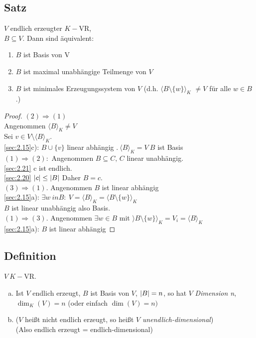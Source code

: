 \subsection{Satz}\label{sec:2.22}
$V$ endlich erzeugter $K-$VR,\\
$B \subseteq V.$ Dann sind äquivalent:\\
\begin{enumerate}[(1)]
\item $B$ ist Basis von V
\item $B$ ist maximal unabhängige Teilmenge von $V$
\item $B$ ist minimales Erzeugungssystem von $V$ (d.h. $\langle B \setminus \{w\}\rangle_K$ $\ne V$ für alle $w \in B$.)
\end{enumerate}
\begin{proof}
$(2) \Rightarrow (1)$\\
Angenommen $\langle B \rangle_K \ne V$\\
Sei $v \in V \setminus \langle B \rangle_K$.\\
\ref{sec:2.15}c): $B \cup \{v\}$ linear abhängig \Lightning$.\ \langle B \rangle_K = V\ B$ ist Basis\\
$(1) \Rightarrow (2):$ Angenommen $B \subseteq C,\, C$ linear unabhängig.\\
\ref{sec:2.21} c ist endlich.\\
\ref{sec:2.20} $\lvert c \rvert \leq \lvert B \rvert$ Daher $B = c$.\\
$(3) \Rightarrow (1)$. Angenommen $B$ ist linear abhängig\\
\ref{sec:2.15}a): $\exists w\ in B:\: V = \langle B \rangle_K = \langle B \setminus \{w\}\rangle_K $\Lightning\\
$B$ ist linear unabhängig also Basis.\\
$(1) \Rightarrow (3)$. Angenommen $\exists w \in B$ mit $\rangle B \setminus \{w\}\rangle_K = V_i = \langle B \rangle_K$\\
\ref{sec:2.15}a): $B$ ist linear abhängig \Lightning
\end{proof}
\subsection{Definition}\label{sec:2.23}
$V\ K-$VR.
\begin{enumerate}[a)]
\item Ist $V$ endlich erzeugt, $B$ ist Basis von $V$, $\lvert B \rvert = n$, so hat $V$ \emph{Dimension n},\\
$\dim_K(V) = n$ (oder einfach $\dim(V) = n)$
\item ($V$ hei\ss t nicht endlich erzeugt, so hei\ss t $V$ \emph{unendlich-dimensional})\\
(Also endlich erzeugt = endlich-dimensional)
\end{enumerate}
